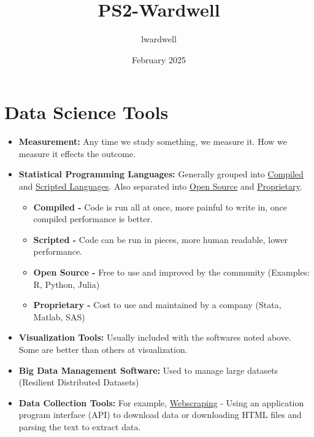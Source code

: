 \documentclass{article}
\title{PS2-Wardwell}
\author{lwardwell }
\date{February 2025}
\begin{document}
\maketitle

\section*{Data Science Tools}
\begin{itemize}
    \item \textbf{Measurement:}
        Any time we study something, we measure it. How we measure it effects the outcome.
    \item \textbf{Statistical Programming Languages:}
        Generally grouped into \underline{Compiled} and \underline{Scripted Languages}. Also separated into \underline{Open Source} and \underline{Proprietary}.
            \begin{itemize}
                \item\textbf{Compiled - } Code is run all at once, more painful to write in, once compiled performance is better.
                \item\par\textbf{Scripted - } Code can be run in pieces, more human readable, lower performance.
                \item\par\textbf{Open Source - } Free to use and improved by the community (Examples: R, Python, Julia)
                \item\par\textbf{Proprietary - } Cost to use and maintained by a company (Stata, Matlab, SAS)
            \end{itemize}
    \item \textbf{Visualization Tools:}
        Usually included with the softwares noted above. Some are better than others at visualization.
    \item \textbf{Big Data Management Software:}
        Used to manage large datasets (Resilient Distributed Datasets) 
    \item \textbf{Data Collection Tools:}
        For example, \underline{Webscraping} - Using an application program interface (API) to download data or downloading HTML files and parsing the text to extract data.
\end{itemize}
\end{document}
